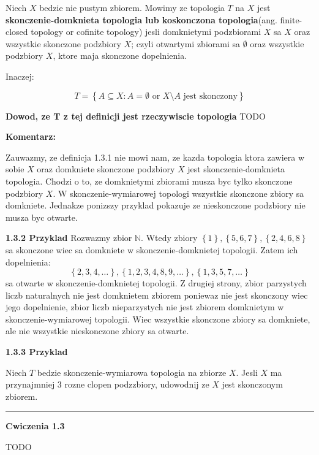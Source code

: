 \documentclass{article}
\begin{document}
\begin{tcolorbox}[colback=white!90!red,colframe=black!35!red,title=1.3.1 Definicja: Skonczenie domknieta topologia(finite-closed topology(cofinite topology))]

Niech $X$ bedzie nie pustym zbiorem. Mowimy ze topologia $T$ na $X$ jest \textbf{skonczenie-domknieta topologia lub koskonczona topologia}(ang. finite-closed topology or cofinite topology) jesli domknietymi podzbiorami $X$ sa $X$ oraz wszystkie skonczone podzbiory $X$; czyli otwartymi zbiorami sa $\emptyset$ oraz wszystkie podzbiory $X$, ktore maja skonczone dopelnienia.

Inaczej:

    $$T = \left\{ A \subseteq X: A = \emptyset \text{ or }X \setminus A\text{ jest skonczony} \right\}$$
\end{tcolorbox}

\textbf{Dowod, ze T z tej definicji jest rzeczywiscie topologia} TODO

\textbf{Komentarz:}

Zauwazmy, ze definicja 1.3.1 nie mowi nam, ze kazda topologia ktora zawiera w sobie $X$ oraz domkniete skonczone podzbiory $X$ jest skonczenie-domknieta topologia. Chodzi o to, ze domknietymi zbiorami musza byc tylko skonczone podzbiory $X$. W skonczenie-wymiarowej topologi wszystkie skonczone zbiory sa domkniete. Jednakze ponizszy przyklad pokazuje ze nieskonczone podzbiory nie musza byc otwarte.

\textbf{1.3.2 Przyklad} Rozwazmy zbior $\mathbb{N}$. Wtedy zbiory $\left\{ 1 \right\}, \left\{ 5,6,7 \right\}, \left\{ 2,4,6,8 \right\}$ sa skonczone wiec sa domkniete w skonczenie-domknietej topologii. Zatem ich dopelnienia:
$$\left\{ 2,3,4,\dots \right\}, \left\{ 1,2,3,4,8,9,\dots \right\}, \left\{ 1,3,5,7,\dots \right\}$$ sa otwarte w skonczenie-domknietej topologii. Z drugiej strony, zbior parzystych liczb naturalnych nie jest domknietem zbiorem poniewaz nie jest skonczony wiec jego dopelnienie, zbior liczb nieparzystych nie jest zbiorem domknietym w skonczenie-wymiarowej topologii. Wiec wszystkie skonczone zbiory sa domkniete, ale nie wszystkie nieskonczone zbiory sa otwarte. 

\textbf{1.3.3 Przyklad}

Niech $T$ bedzie skonczenie-wymiarowa topologia na zbiorze $X$. Jesli $X$ ma przynajmniej 3 rozne clopen podzzbiory, udowodnij ze $X$ jest skonczonym zbiorem.


\hrule

\textbf{Cwiczenia 1.3}

TODO
\end{document}
